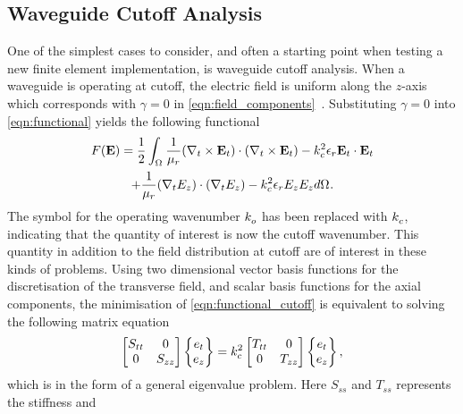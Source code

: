 \subsection{Waveguide Cutoff Analysis}
\label{sec:cutoff_formulation}
One of the simplest cases to consider, and often a starting point when
testing a new finite element implementation, is waveguide cutoff
analysis. When a waveguide is operating at cutoff, the electric field
is uniform along the $z$-axis which corresponds with $\gamma = 0$ in
\eqref{eqn:field_components}~\cite{Poz2005}.  Substituting $\gamma = 0$ into
\eqref{eqn:functional} yields the following functional
\begin{multline}
    \label{eqn:functional_cutoff}
    F(\Ef) = \inv{2}\int_{\Domain{}}\inv{\ur}(\curl{\Ef_t}{t})\cdot(\curl{\Ef_t}{t}) -\ko{c}{2}\er\Ef_t\cdot{\Ef_t}\\
    +\inv{\ur}(\del{E_z}{t})\cdot(\del{E_z}{t})
    -\ko{c}{2}\er E_z{E_z} d\Domain{}.
\end{multline}
The symbol for the operating wavenumber
$k_{o}^{}$ has been replaced with $k_{c}^{}$, indicating that the
quantity of interest is now the cutoff
wavenumber. This quantity in addition to the
field distribution at cutoff are of interest in these kinds of
problems.  Using two dimensional vector basis functions for the
discretisation of the transverse field, and scalar basis functions for
the axial components, the minimisation of
\eqref{eqn:functional_cutoff} is equivalent to solving the following
matrix equation
\begin{equation}
    \label{eqn:matrix_equation_cutoff}
    \begin{bmatrix} S_{tt} & 0\\0 &
    S_{zz}\end{bmatrix}\begin{Bmatrix}e_t\\e_z\end{Bmatrix} =
    \ko{c}{2}\begin{bmatrix} T_{tt} & 0\\0 &
    T_{zz}\end{bmatrix}\begin{Bmatrix}e_t\\e_z\end{Bmatrix},
\end{equation}
which is in the form of a general eigenvalue problem.  Here $S_{ss}$ and $T_{ss}$ represents the stiffness and
